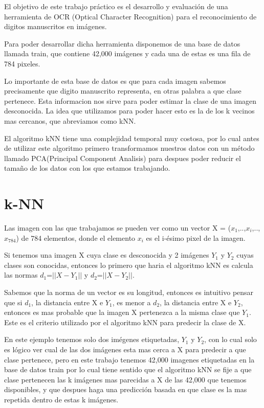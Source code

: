 El objetivo de este trabajo práctico es el desarrollo y evaluación de una herramienta de OCR (Optical Character Recognition) para el reconocimiento de digitos manuscritos en imágenes. \par
\indent Para poder desarrollar dicha herramienta disponemos de una base de datos llamada train, que contiene  42,000 imágenes y cada una de estas es una fila de 784 pixeles. \par
\indent Lo importante de esta base de datos es que para cada imagen sabemos precisamente que digito manuscrito representa, en otras palabra a que clase pertenece. Esta informacion nos sirve para poder estimar la clase de una imagen desconocida. La idea que utilizamos para poder hacer esto es la de los k vecinos mas cercanos, que abreviamos como kNN. \par
\indent El algoritmo kNN tiene una complejidad temporal muy costosa, por lo cual antes de utilizar este algoritmo primero transformamos nuestros datos con un método llamado PCA(Principal Component Analisis) para despues poder reducir el tamaño de los datos con los que estamos trabajando.\par

\section{k-NN}
Las imagen con las que trabajamos se pueden ver como un vector X = ($x_{1}$,..,$x_{i}$,..,$x_{784}$) de 784 elementos, donde el elemento $x_i$ es el i-ésimo pixel de la imagen.\par
\indent Si tenemos una imagen X cuya clase es desconocida y 2 imágenes $Y_1$ y $Y_2$ cuyas clases son conocidas, entonces lo primero que haria el algoritmo kNN es calcula las normas $d_1$=$||X-Y_1||$ y $d_2$=$||X-Y_2||$. \par
\indent Sabemos que la norma de un vector es su longitud, entonces es intuitivo pensar que si $d_1$, la distancia entre X e $Y_1$, es menor a $d_2$, la distancia entre X e $Y_2$, entonces es mas probable que la imagen X pertenezca a la misma clase que $Y_1$. Este es el criterio utilizado por el algoritmo kNN para predecir la clase de X.  \par
\indent En este ejemplo tenemos solo dos imégenes etiquetadas, $Y_1$ y $Y_2$, con lo cual solo es lógico ver cual de las dos imágenes esta mas cerca a X para predecir a que clase pertenece, pero en este trabajo tenemos 42,000 imagenes etiquetadas en la base de datos train por lo cual tiene sentido que el algoritmo kNN se fije a que clase pertenecen las k imágenes mas parecidas a X de las 42,000 que tenemos disponibles, y que despues haga una predicción basada en que clase es la mas repetida dentro de estas k imágenes.\par

